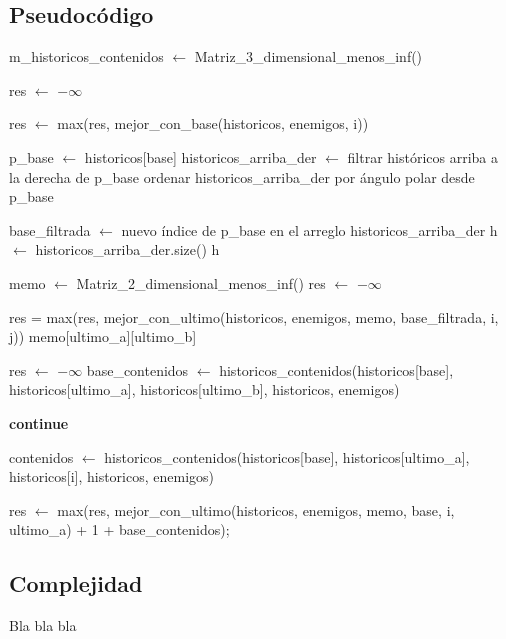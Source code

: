 \subsection{Pseudocódigo}
\begin{algorithmic}
	\State m_historicos_contenidos $\gets$ Matriz_3_dimensional_menos_inf() 

	\State res $\gets$ $-\infty$

		\State res $\gets$ max(res, mejor_con_base(historicos, enemigos, i))
	\EndFor

\EndFunction

	\State p_base $\gets$ historicos[base]
	\State historicos_arriba_der $\gets$ filtrar históricos arriba a la derecha de p_base
	\State ordenar historicos_arriba_der por ángulo polar desde p_base

	\State base_filtrada $\gets$ nuevo índice de p_base en el arreglo historicos_arriba_der
	\State h $\gets$ historicos_arriba_der.size()
		\State \Return h
	\EndIf

	\State memo $\gets$ Matriz_2_dimensional_menos_inf() 
	\State res $\gets$ $-\infty$

			 
				\State res = max(res, mejor_con_ultimo(historicos, enemigos, memo, base_filtrada, i, j))
			\EndIf
		\EndFor
	\EndFor
\EndFunction
{}
		\State \Return memo[ultimo_a][ultimo_b]
	\EndIf

	\State res $\gets$ $-\infty$
	\State {} 
	\State base_contenidos $\gets$ historicos_contenidos(historicos[base], historicos[ultimo_a], historicos[ultimo_b], historicos, enemigos) 

				\State \textbf{continue}
			\EndIf

			\State contenidos $\gets$ historicos_contenidos(historicos[base], historicos[ultimo_a], historicos[i], historicos, enemigos)

			 
				res $\gets$ max(res, mejor_con_ultimo(historicos, enemigos, memo, base, i, ultimo_a) + 1 + base_contenidos);

			\EndIf

		\EndFor
	\EndIf
\EndFunction


\end{algorithmic}



\subsection{Complejidad}
Bla bla bla